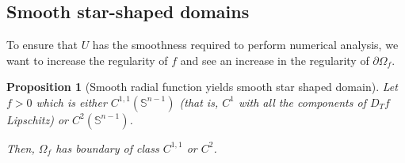 \documentclass[english,a4paper,10pt,oneside]{scrbook}	%
\theoremstyle{break}
\newtheorem{prop}[equation]{Proposition}
\theoremstyle{remark}
\newcommand{\mS}{\mathbb{S}^{n-1}}
\begin{document}
\subsection{Smooth star-shaped domains}

To ensure that $U$ has the smoothness required to perform numerical analysis, we want to increase the regularity of $f$ and see an increase in the regularity of $\partial \Omega_f$.

\begin{prop}[Smooth radial function yields smooth star shaped domain]
\label{prop:Co_domain}
Let $f>0$ which is either $C^{1,1}(\mS)$ (that is, $C^1$ with all the components of $D_T f$ Lipschitz) or $C^2(\mS)$.  

Then, $\Omega_f$ has boundary of class $C^{1,1}$ or $C^2$.

\end{prop}
\end{document}
